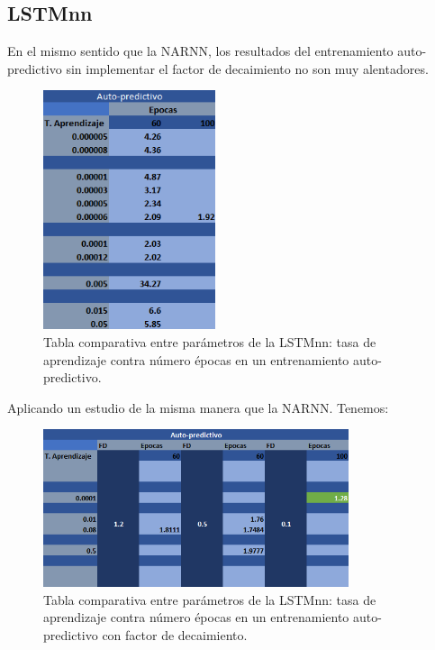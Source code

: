 \subsection{LSTMnn}

En el mismo sentido que la NARNN, los resultados del entrenamiento auto-predictivo sin implementar el factor de decaimiento no son muy alentadores.

\begin{figure}[H]
    \centering
    \includegraphics[width=0.45\textwidth]{Figuras/proceso_de_entrenamiento/lr_epocas_LSTM_auto_pred.png}
    \caption{Tabla comparativa entre parámetros de la LSTMnn: tasa de aprendizaje contra número épocas en un entrenamiento auto-predictivo.} 
    \label{fig:lr_epocas_LSTMnn_autopred}
\end{figure}

\newpage

Aplicando un estudio de la misma manera que la NARNN. Tenemos:

\begin{figure}[H]
    \centering
    \includegraphics[width=0.8\textwidth]{Figuras/proceso_de_entrenamiento/lr_epocas_LSTM_autopred_v2.png}
    \caption{Tabla comparativa entre parámetros de la LSTMnn: tasa de aprendizaje contra número épocas en un entrenamiento auto-predictivo con factor de decaimiento.} 
    \label{fig:lr_epocas_LSTMnn_autopred_v2}
\end{figure}

